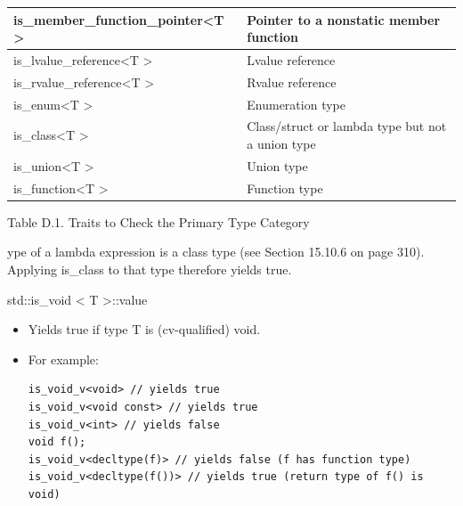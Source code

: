 \begin{table}[H]
\begin{tabular}{|l|l|}
		is\_member\_function\_pointer\textless{}T \textgreater{} & Pointer to a nonstatic member function                                                                         \\ \hline
		is\_lvalue\_reference\textless{}T \textgreater{}         & Lvalue reference                                                                                               \\ \hline
		is\_rvalue\_reference\textless{}T \textgreater{}         & Rvalue reference                                                                                               \\ \hline
		is\_enum\textless{}T \textgreater{}                      & Enumeration type                                                                                               \\ \hline
		is\_class\textless{}T \textgreater{}                     & Class/struct or lambda type but not a union type                                                               \\ \hline
		is\_union\textless{}T \textgreater{}                     & Union type                                                                                                     \\ \hline
		is\_function\textless{}T \textgreater{}                  & Function type                                                                                                  \\ \hline
	\end{tabular}
\end{table}

\begin{center}
Table D.1. Traits to Check the Primary Type Category
\end{center}

ype of a lambda expression is a class type (see Section 15.10.6 on page 310). Applying is\_class to that type therefore yields true.

std::is\_void < T >::value

\begin{itemize}
\item 
Yields true if type T is (cv-qualified) void.

\item 
For example:
\begin{lstlisting}[style=styleCXX]
is_void_v<void> // yields true
is_void_v<void const> // yields true
is_void_v<int> // yields false
void f();
is_void_v<decltype(f)> // yields false (f has function type)
is_void_v<decltype(f())> // yields true (return type of f() is void)
\end{lstlisting}

\end{itemize}

